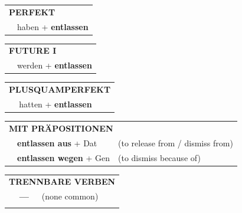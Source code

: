 \documentclass[10pt,a4paper]{revtex4-2}
\begin{document}
\begin{verbbox}
 \begin{tabular}{rl}
     \multicolumn{2}{l}{\textbf{PERFEKT}}\\
   & haben + \textbf{entlassen}\\
  \end{tabular}
\hfill
   \begin{tabular}{rl}
    \multicolumn{2}{l}{\textbf{FUTURE I} }\\
   & werden + \textbf{entlassen}\\
  \end{tabular}
\hfill
   \begin{tabular}{rl}
      \multicolumn{2}{l}{\textbf{PLUSQUAMPERFEKT}}\\
   & hatten + \textbf{entlassen}\\
  \end{tabular}

   \vspace{10pt}

   \begin{tabular}{lll}
      \multicolumn{3}{l}{\textbf{MIT PRÄPOSITIONEN}}\\
& \textbf{entlassen aus} + Dat & (to release from / dismiss from)\\
& \textbf{entlassen wegen} + Gen & (to dismiss because of)\\
\end{tabular}
  \hfill
   \begin{tabular}{lll}
      \multicolumn{3}{l}{\textbf{TRENNBARE VERBEN}}\\
 & \textbf{---} & (none common)\\
\vspace{10pt}
  \end{tabular}

  \vspace{-5pt}

\end{verbbox}
\end{document}
